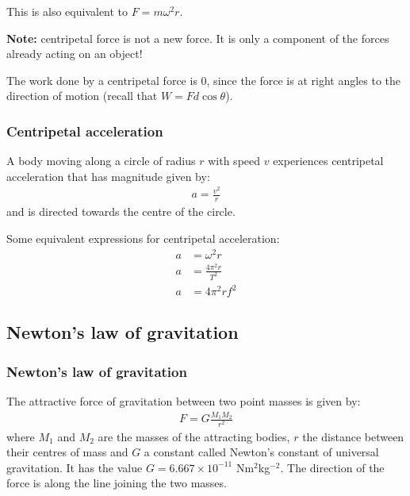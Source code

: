 This is also equivalent to $F = m\omega^2 r$.

\textbf{Note:} centripetal force is not a new force. It is only a component of
the forces already acting on an object!

The work done by a centripetal force is 0, since the force is at right angles
to the direction of motion (recall that $W = Fd\cos\theta$).

\subsubsection{Centripetal acceleration}
\begin{definition}
    A body moving along a circle of radius $r$ with speed $v$ experiences
    centripetal acceleration that has magnitude given by:
    \begin{align*}
        a = \frac{v^2}{r}
    \end{align*}
    and is directed towards the centre of the circle.
\end{definition}

Some equivalent expressions for centripetal acceleration:
\begin{align*}
    a &= \omega^2 r \\
    a &= \frac{4 \pi^2 r}{T^2} \\
    a &= 4\pi^2 r f^2
\end{align*}

\subsection{Newton's law of gravitation}

\subsubsection{Newton's law of gravitation}
\begin{definition}
    The attractive force of gravitation between two point masses is given by:
    \begin{align*}
        F = G \frac{M_1 M_2}{r^2}
    \end{align*}
    where $M_1$ and $M_2$ are the masses of the attracting bodies, $r$ the
    distance between their centres of mass and $G$ a constant called Newton's
    constant of universal gravitation. It has the value
    $G = 6.667 \times 10^{-11}$ Nm$^2$kg$^{-2}$. The direction of the force is
    along the line joining the two masses.
\end{definition}

